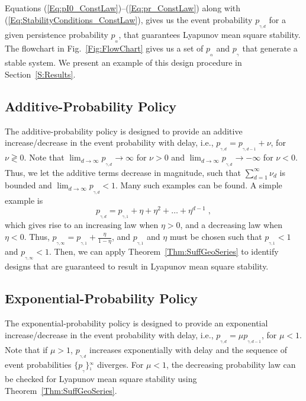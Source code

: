 \documentclass[twocolumn]{autart}
\begin{document}
Equations (\ref{Eq:pI0_ConstLaw})--(\ref{Eq:pr_ConstLaw}) along with (\ref{Eq:StabilityConditions_ConstLaw}), gives us the event probability $p_{_{\gamma,d}}$ for a given persistence probability $p_{_{\alpha}}$, that guarantees Lyapunov mean square stability. The flowchart in Fig.~\ref{Fig:FlowChart} gives us a set of $p_{_\alpha}$ and $p_{_{\gamma}}$ that generate a stable system. We present an example of this design procedure in Section~\ref{S:Results}.



\subsection{Additive-Probability Policy}
The additive-probability policy is designed to provide an additive increase/decrease in the event probability with delay, i.e., $p_{_{\gamma,d}} = p_{_{\gamma,d-1}} + \nu$, for $\nu \gtrless 0$. Note that $\lim_{d \to \infty} p_{_{\gamma,d}} \rightarrow \infty$ for $\nu > 0$ and $\lim_{d \to \infty} p_{_{\gamma,d}} \rightarrow -\infty$ for $\nu < 0$. Thus, we let the additive terms decrease in magnitude, such that $\sum_{d=1}^{\infty} \nu_d$ is bounded and $\lim_{d \to \infty} p_{_{\gamma,d}} < 1$. Many such examples can be found. A simple example is
\begin{equation} \label{Eq:IncSchedLaw}
p_{_{\gamma,d}} = p_{_{\gamma,1}} + \eta + \eta^2 + \dots + \eta^{d-1} \; ,
\end{equation}
which gives rise to an increasing law when $\eta > 0$, and a decreasing law when $\eta < 0$. Thus, $p_{_{\gamma,\infty}} = p_{_{\gamma,1}} + \frac{\eta}{1-\eta}$, and $p_{_{\gamma,1}}$ and $\eta$ must be chosen such that $p_{_{\gamma,1}} < 1$ and $p_{_{\gamma,\infty}} < 1$. Then, we can apply Theorem~\ref{Thm:SuffGeoSeries} to identify designs that are guaranteed to result in Lyapunov mean square stability.

\subsection{Exponential-Probability Policy}
The exponential-probability policy is designed to provide an exponential increase/decrease in the event probability with delay, i.e., $p_{_{\gamma,d}} = \mu p_{_{\gamma,d-1}}$, for $\mu < 1$. Note that if $\mu > 1$, $p_{_{\gamma,d}}$ increases exponentially with delay and the sequence of event probabilities $\{p_{_{\gamma}}\}_{^{1}}^{_{\infty}}$ diverges. For $\mu < 1$, the decreasing probability law can be checked for Lyapunov mean square stability using Theorem~\ref{Thm:SuffGeoSeries}.
\end{document}

